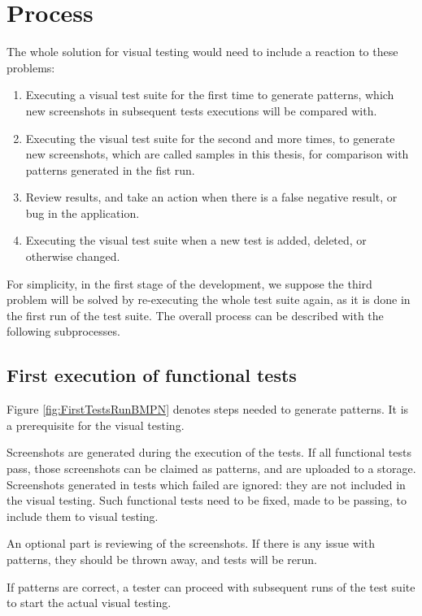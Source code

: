 \documentclass[11pt,oneside,final]{fithesis2}
\begin{document}
  \section{Process}
  \label{sec:process}
  The whole solution for visual testing would need to include a reaction to these problems:
  \begin{enumerate}
   \item Executing a visual test suite for the first time to generate patterns, which new screenshots in subsequent tests executions will be compared with.
   \item Executing the visual test suite for the second and more times, to generate new screenshots, which are called samples in this thesis, for comparison with patterns generated in the fist run.
   \item Review results, and take an action when there is a false negative result, or bug in the application.
   \item Executing the visual test suite when a new test is added, deleted, or otherwise changed.
  \end{enumerate}

  For simplicity, in the first stage of the development, we suppose the third problem will be solved by re-executing the whole test suite
  again, as it is done in the first run of the test suite. The overall process can be described with the following subprocesses.
  
  \subsection{First execution of functional tests}
  \label{chap:firstRunProc}
  
  Figure \ref{fig:FirstTestsRunBMPN} denotes steps needed to generate patterns. It is a prerequisite for the visual testing.
  
  Screenshots are generated during the execution of the tests. If all functional tests pass, those screenshots
  can be claimed as patterns, and are uploaded to a storage. Screenshots generated in tests which failed are ignored: they are
  not included in the visual testing. Such functional tests need to be fixed, made to be passing, to include them to visual testing.
  
  An optional part is reviewing of the screenshots. If there is any issue with patterns, they should be thrown away, and tests will be rerun.
  
  If patterns are correct, a tester can proceed with subsequent runs of the test suite to start the actual visual testing.
  
\end{document}
